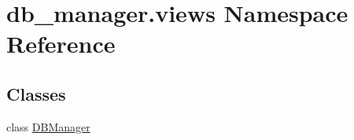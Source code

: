 \hypertarget{namespacedb__manager_1_1views}{\section{db\-\_\-manager.\-views Namespace Reference}
\label{namespacedb__manager_1_1views}
}
\subsection*{Classes}
\begin{DoxyCompactItemize}
\item 
class \hyperlink{classdb__manager_1_1views_1_1DBManager}{D\-B\-Manager}
\end{DoxyCompactItemize}
